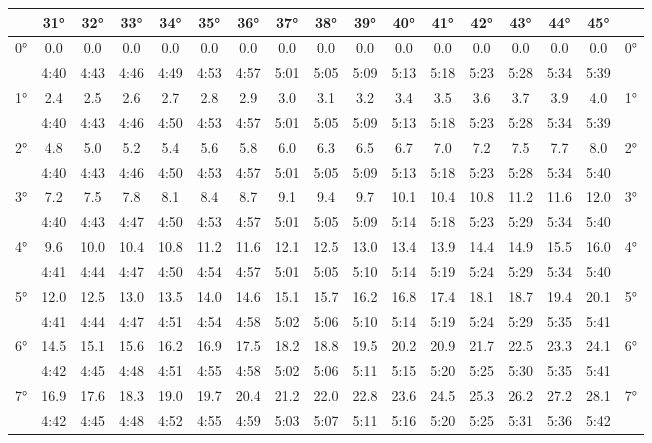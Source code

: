 \begin{footnotesize}\begin{tabular}{c || c | c | c | c | c | c | c | c | c | c | c | c | c | c | c || c}
		\space &31°&32°&33°&34°&35°&36°&37°&38°&39°&40°&41°&42°&43°&44°&45°\\\hline\hline
		\multirow{2}{*}{0°}&0.0&0.0&0.0&0.0&0.0&0.0&0.0&0.0&0.0&0.0&0.0&0.0&0.0&0.0&0.0&\multirow{2}{*}{0°}\\ \space&4:40&4:43&4:46&4:49&4:53&4:57&5:01&5:05&5:09&5:13&5:18&5:23&5:28&5:34&5:39&\space\\\hline
		\multirow{2}{*}{1°}&2.4&2.5&2.6&2.7&2.8&2.9&3.0&3.1&3.2&3.4&3.5&3.6&3.7&3.9&4.0&\multirow{2}{*}{1°}\\ \space&4:40&4:43&4:46&4:50&4:53&4:57&5:01&5:05&5:09&5:13&5:18&5:23&5:28&5:34&5:39&\space\\\hline
		\multirow{2}{*}{2°}&4.8&5.0&5.2&5.4&5.6&5.8&6.0&6.3&6.5&6.7&7.0&7.2&7.5&7.7&8.0&\multirow{2}{*}{2°}\\ \space&4:40&4:43&4:46&4:50&4:53&4:57&5:01&5:05&5:09&5:13&5:18&5:23&5:28&5:34&5:40&\space\\\hline
		\multirow{2}{*}{3°}&7.2&7.5&7.8&8.1&8.4&8.7&9.1&9.4&9.7&10.1&10.4&10.8&11.2&11.6&12.0&\multirow{2}{*}{3°}\\ \space&4:40&4:43&4:47&4:50&4:53&4:57&5:01&5:05&5:09&5:14&5:18&5:23&5:29&5:34&5:40&\space\\\hline
		\multirow{2}{*}{4°}&9.6&10.0&10.4&10.8&11.2&11.6&12.1&12.5&13.0&13.4&13.9&14.4&14.9&15.5&16.0&\multirow{2}{*}{4°}\\ \space&4:41&4:44&4:47&4:50&4:54&4:57&5:01&5:05&5:10&5:14&5:19&5:24&5:29&5:34&5:40&\space\\\hline
		\multirow{2}{*}{5°}&12.0&12.5&13.0&13.5&14.0&14.6&15.1&15.7&16.2&16.8&17.4&18.1&18.7&19.4&20.1&\multirow{2}{*}{5°}\\ \space&4:41&4:44&4:47&4:51&4:54&4:58&5:02&5:06&5:10&5:14&5:19&5:24&5:29&5:35&5:41&\space\\\hline
		\multirow{2}{*}{6°}&14.5&15.1&15.6&16.2&16.9&17.5&18.2&18.8&19.5&20.2&20.9&21.7&22.5&23.3&24.1&\multirow{2}{*}{6°}\\ \space&4:42&4:45&4:48&4:51&4:55&4:58&5:02&5:06&5:11&5:15&5:20&5:25&5:30&5:35&5:41&\space\\\hline
		\multirow{2}{*}{7°}&16.9&17.6&18.3&19.0&19.7&20.4&21.2&22.0&22.8&23.6&24.5&25.3&26.2&27.2&28.1&\multirow{2}{*}{7°}\\ \space&4:42&4:45&4:48&4:52&4:55&4:59&5:03&5:07&5:11&5:16&5:20&5:25&5:31&5:36&5:42&\space\\\hline

\end{tabular}
\end{footnotesize}
